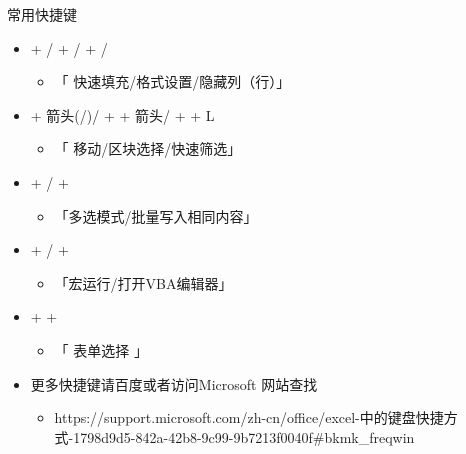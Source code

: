 \begin{frame}{常用快捷键}
\pause
\begin{itemize}
  \item<+->  + /  +  /  + /

  \begin{itemize}
    \item  「 快速填充/格式设置/隐藏列（行）」
  \end{itemize}

  \item<+->  + 箭头(/)/ +  + 箭头/ +  + L

  \begin{itemize}
    \item 「	移动/区块选择/快速筛选」 			
  \end{itemize}

  \item<+->  + /  + 

  \begin{itemize}
    \item 「多选模式/批量写入相同内容」
  \end{itemize}

  \item<+->  + /  + 
	
	\begin{itemize}		
		\item 「宏运行/打开VBA编辑器」
	\end{itemize}

  \item<+->  +  + 
	
	\begin{itemize}
		\item 「 表单选择	」
	\end{itemize}
  \item<+-> 更多快捷键请百度或者访问Microsoft 网站查找

  \begin{itemize}
    \item {\tiny
    	https://support.microsoft.com/zh-cn/office/excel-中的键盘快捷方式-1798d9d5-842a-42b8-9c99-9b7213f0040f\#bkmk\_freqwin
       }
  \end{itemize}
\end{itemize}
\end{frame}

